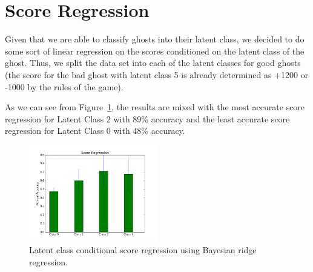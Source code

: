 \documentclass[11pt]{amsart}
\begin{document}
\section{Score Regression}

Given that we are able to classify ghosts into their latent class, we decided to do some sort of linear regression on the scores conditioned on the latent class of the ghost. Thus, we split the data set into each of the latent classes for good ghosts (the score for the bad ghost with latent class 5 is already determined as +1200 or -1000 by the rules of the game). 

As we can see from Figure~\ref{fig:score}, the results are mixed with the most accurate score regression for Latent Class 2 with 89\% accuracy and the least accurate score regression for Latent Class 0 with 48\% accuracy.

\begin{figure}[b]
	\centering
	\includegraphics[width=0.5\textwidth]{score_regression.png}
	\caption{Latent class conditional score regression using Bayesian ridge regression.}
	\label{fig:score}
\end{figure}
\end{document}
